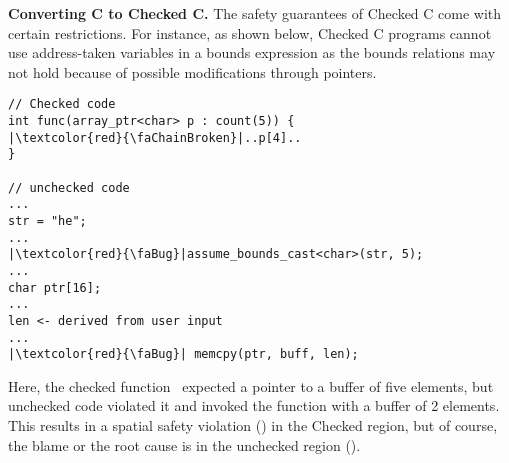 \noindent
\textbf{Converting C to Checked C.} The safety guarantees of Checked C come with certain restrictions. For instance, as shown below, Checked C programs cannot use address-taken variables in a bounds expression as the bounds relations may not hold because of possible modifications through pointers.
\begin{verbatim}
// Checked code
int func(array_ptr<char> p : count(5)) {
|\textcolor{red}{\faChainBroken}|..p[4]..
}

// unchecked code
...
str = "he";
...
|\textcolor{red}{\faBug}|assume_bounds_cast<char>(str, 5); 
...
char ptr[16];
...
len <- derived from user input
...
|\textcolor{red}{\faBug}| memcpy(ptr, buff, len);
\end{verbatim}
Here, the checked function~ expected a pointer to a buffer of five elements, but unchecked code violated it and invoked the function with a buffer of 2 elements.
This results in a spatial safety violation (\textcolor{red}{\faChainBroken}) in the Checked region, but of course, the blame or the root cause is in the unchecked region (\textcolor{red}{\faBug}).
